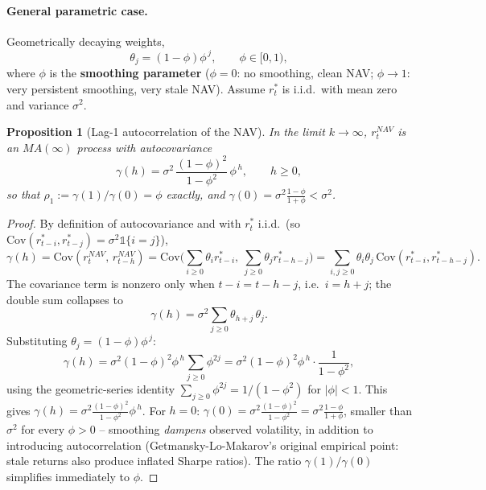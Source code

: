 \documentclass[11pt]{article}
\newtheorem{proposition}{Proposition}
\begin{document}
\paragraph{General parametric case.} Geometrically decaying weights,
\[
\theta_j = (1-\phi)\phi^{\,j}, \qquad \phi \in [0,1),
\]
where $\phi$ is the \textbf{smoothing parameter} ($\phi=0$: no smoothing, clean NAV; $\phi \to 1$: very persistent smoothing, very stale NAV). Assume $r^\ast_t$ is i.i.d.\ with mean zero and variance $\sigma^2$.

\begin{proposition}[Lag-1 autocorrelation of the NAV]
\label{prop:rho1}
In the limit $k\to\infty$, $r^{NAV}_t$ is an $MA(\infty)$ process with autocovariance
\[
\gamma(h) = \sigma^2\,\frac{(1-\phi)^2}{1-\phi^2}\,\phi^{\,h}, \qquad h\ge 0,
\]
so that $\rho_1 := \gamma(1)/\gamma(0) = \phi$ \emph{exactly}, and $\gamma(0) = \sigma^2\frac{1-\phi}{1+\phi} < \sigma^2$.
\end{proposition}

\begin{proof}
By definition of autocovariance and with $r^\ast_t$ i.i.d.\ (so $\mathrm{Cov}(r^\ast_{t-i}, r^\ast_{t-j}) = \sigma^2 \mathbb{1}\{i=j\}$),
\[
\gamma(h) = \mathrm{Cov}(r^{NAV}_t,\, r^{NAV}_{t-h}) = \mathrm{Cov}\Big(\sum_{i\ge 0}\theta_i r^\ast_{t-i},\ \sum_{j\ge 0}\theta_j r^\ast_{t-h-j}\Big) = \sum_{i,j\ge 0}\theta_i\theta_j\,\mathrm{Cov}(r^\ast_{t-i}, r^\ast_{t-h-j}).
\]
The covariance term is nonzero only when $t-i = t-h-j$, i.e.\ $i = h+j$; the double sum collapses to
\[
\gamma(h) = \sigma^2 \sum_{j\ge 0} \theta_{h+j}\,\theta_j.
\]
Substituting $\theta_j = (1-\phi)\phi^{\,j}$:
\[
\gamma(h) = \sigma^2(1-\phi)^2\phi^{\,h}\sum_{j\ge 0}\phi^{2j} = \sigma^2(1-\phi)^2\phi^{\,h}\cdot\frac{1}{1-\phi^2},
\]
using the geometric-series identity $\sum_{j\ge 0}\phi^{2j} = 1/(1-\phi^2)$ for $|\phi|<1$. This gives $\gamma(h) = \sigma^2\frac{(1-\phi)^2}{1-\phi^2}\phi^{\,h}$. For $h=0$: $\gamma(0) = \sigma^2\frac{(1-\phi)^2}{1-\phi^2} = \sigma^2\frac{1-\phi}{1+\phi}$, smaller than $\sigma^2$ for every $\phi>0$ -- smoothing \emph{dampens} observed volatility, in addition to introducing autocorrelation (Getmansky-Lo-Makarov's original empirical point: stale returns also produce inflated Sharpe ratios). The ratio $\gamma(1)/\gamma(0)$ simplifies immediately to $\phi$.
\end{proof}
\end{document}
